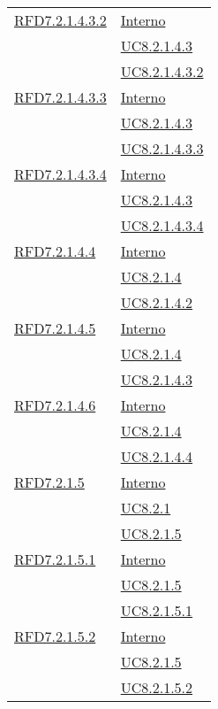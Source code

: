 \begin{longtable}{|>{\centering}m{5cm}|m{5cm}<{\centering}|}
\hyperlink{RFD7.2.1.4.3.2}{RFD7.2.1.4.3.2} & \hyperlink{Interno}{Interno}\\
& \hyperref[UC8.2.1.4.3]{UC8.2.1.4.3}\\
& \hyperref[UC8.2.1.4.3.2]{UC8.2.1.4.3.2}\\ \hline

\hyperlink{RFD7.2.1.4.3.3}{RFD7.2.1.4.3.3} & \hyperlink{Interno}{Interno}\\
& \hyperref[UC8.2.1.4.3]{UC8.2.1.4.3}\\
& \hyperref[UC8.2.1.4.3.3]{UC8.2.1.4.3.3}\\ \hline

\hyperlink{RFD7.2.1.4.3.4}{RFD7.2.1.4.3.4} & \hyperlink{Interno}{Interno}\\
& \hyperref[UC8.2.1.4.3]{UC8.2.1.4.3}\\
& \hyperref[UC8.2.1.4.3.4]{UC8.2.1.4.3.4}\\ \hline

\hyperlink{RFD7.2.1.4.4}{RFD7.2.1.4.4} & \hyperlink{Interno}{Interno}\\
& \hyperref[UC8.2.1.4]{UC8.2.1.4}\\
& \hyperref[UC8.2.1.4.2]{UC8.2.1.4.2}\\ \hline

\hyperlink{RFD7.2.1.4.5}{RFD7.2.1.4.5} & \hyperlink{Interno}{Interno}\\
& \hyperref[UC8.2.1.4]{UC8.2.1.4}\\
& \hyperref[UC8.2.1.4.3]{UC8.2.1.4.3}\\ \hline

\hyperlink{RFD7.2.1.4.6}{RFD7.2.1.4.6} & \hyperlink{Interno}{Interno}\\
& \hyperref[UC8.2.1.4]{UC8.2.1.4}\\
& \hyperref[UC8.2.1.4.4]{UC8.2.1.4.4}\\ \hline

\hyperlink{RFD7.2.1.5}{RFD7.2.1.5} & \hyperlink{Interno}{Interno}\\
& \hyperref[UC8.2.1]{UC8.2.1}\\
& \hyperref[UC8.2.1.5]{UC8.2.1.5}\\ \hline

\hyperlink{RFD7.2.1.5.1}{RFD7.2.1.5.1} & \hyperlink{Interno}{Interno}\\
& \hyperref[UC8.2.1.5]{UC8.2.1.5}\\
& \hyperref[UC8.2.1.5.1]{UC8.2.1.5.1}\\ \hline

\hyperlink{RFD7.2.1.5.2}{RFD7.2.1.5.2} & \hyperlink{Interno}{Interno}\\
& \hyperref[UC8.2.1.5]{UC8.2.1.5}\\
& \hyperref[UC8.2.1.5.2]{UC8.2.1.5.2}\\ \hline


\end{longtable}
